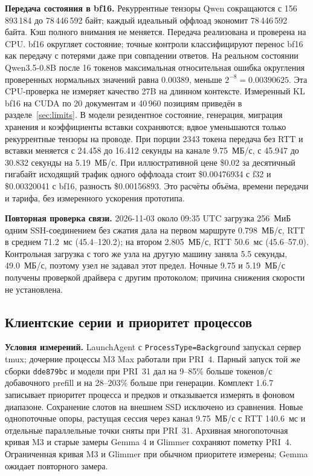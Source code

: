 \textbf{Передача состояния в bf16.} Рекуррентные тензоры Qwen сокращаются с 156\,893\,184 до 78\,446\,592 байт;
каждый идеальный оффлоад экономит 78\,446\,592 байта. Кэш полного внимания не меняется.
Передача реализована и проверена на CPU. bf16 округляет состояние;
точные контроли классифицируют перенос bf16 как передачу с потерями даже при совпадении ответов.
На реальном состоянии Qwen3.5-0.8B после 16 токенов максимальная относительная ошибка округления
проверенных нормальных значений равна 0.00389, меньше $2^{-8}=0.00390625$.
Эта CPU-проверка не измеряет качество 27B на длинном контексте.
Измеренный KL bf16 на CUDA по 20 документам и 40\,960 позициям приведён в разделе~\ref{sec:limits}.
В модели резидентное состояние, генерация, миграция хранения и коэффициенты вставки сохраняются;
вдвое уменьшаются только рекуррентные тензоры на проводе.
При порции 2343 токена передача без RTT и вставки меняется с 24.458 до 16.412 секунды на канале 9.75~МБ/с,
с 45.947 до 30.832 секунды на 5.19~МБ/с. При иллюстративной цене \$0.02 за десятичный гигабайт
исходящий трафик одного оффлоада стоит \$0.00476934 с f32 и \$0.00320041 с bf16,
разность \$0.00156893. Это расчёты объёма, времени передачи и тарифа, без измеренного ускорения прототипа.

\textbf{Повторная проверка связи.} 2026-11-03 около 09:35 UTC загрузка 256~МиБ одним SSH-соединением
без сжатия дала на первом маршруте 0.798~МБ/с, RTT в среднем 71.2~мс (45.4--120.2);
на втором 2.805~МБ/с, RTT 50.6~мс (45.6--57.0).
Контрольная загрузка с того же узла на другую машину заняла 5.5 секунды, 49.0~МБ/с, поэтому узел не задавал этот предел.
Ночные 9.75 и 5.19~МБ/с получены проверкой драйвера с другим протоколом; причина снижения скорости не установлена.

\subsection{Клиентские серии и приоритет процессов}
\label{app:client-methods}

\textbf{Условия измерений.} LaunchAgent с \texttt{ProcessType=Background} запускал сервер tmux;
дочерние процессы M3 Max работали при PRI~4. Парный запуск той же сборки \texttt{dde879bc}
и модели при PRI~31 дал на 9--85\% больше токенов/с добавочного prefill и на 28--203\% больше
при генерации. Комплект 1.6.7 записывает приоритет процесса и предков и отказывается измерять
в фоновом диапазоне. Сохранение слотов на внешнем SSD исключено из сравнения.
Новые однопоточные опоры, растущая сессия через канал 9.75~МБ/с с RTT 140.6~мс и отдельные параллельные точки сняты при PRI~31.
Архивная многопоточная кривая M3 и старые замеры Gemma 4 и Glimmer сохраняют пометку PRI~4.
Ограниченная кривая M3 и Glimmer при обычном приоритете измерены; Gemma ожидает повторного замера.

